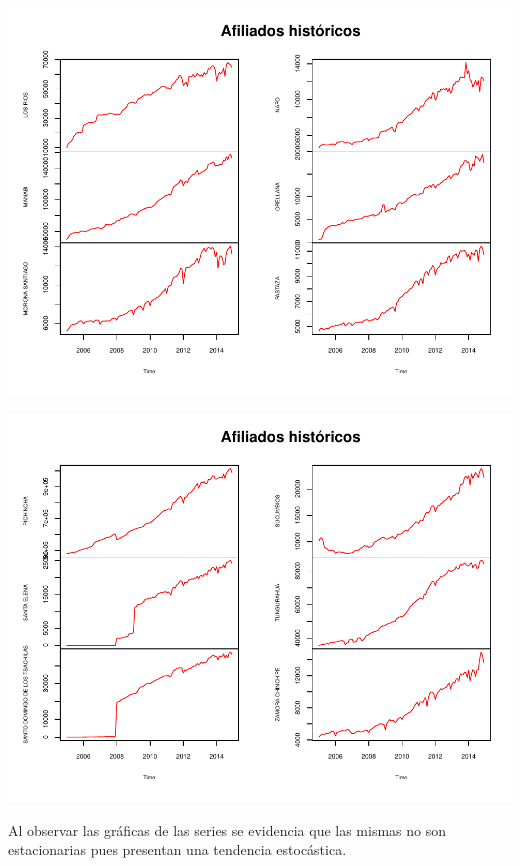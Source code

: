 \documentclass[11pt,a4paper,oneside]{article}\usepackage[]{graphicx}\usepackage[]{color}
\makeatletter
\def\maxwidth{ %
  \ifdim\Gin@nat@width>\linewidth
    \linewidth
  \else
    \Gin@nat@width
  \fi
}
\newenvironment{knitrout}{}{} %
\makeatother
\begin{document}
\begin{knitrout}
{\centering \includegraphics[width=\maxwidth]{figure/unnamed-chunk-1-3} 

}




{\centering \includegraphics[width=\maxwidth]{figure/unnamed-chunk-1-4} 

}



\end{knitrout}


Al observar las gráficas de las series se evidencia que las mismas no son estacionarias pues presentan una tendencia estocástica.\newline
\end{document}
